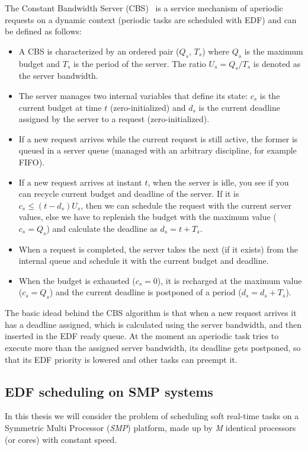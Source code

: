 The Constant Bandwidth Server (CBS)~\cite{abeniButtazzo98,
  abeniButtazzo04} is a service mechanism of aperiodic requests on a
dynamic context (periodic tasks are scheduled with EDF) and can be
defined as follows:
\begin{itemize}
\item A CBS is characterized by an ordered pair ($Q_{s}$, $T_{s}$)
  where $Q_{s}$ is the maximum budget and $T_{s}$ is the period of the
  server. The ratio $U_{s} = Q_{s}/T_{s}$ is denoted as the server
  bandwidth.
\item The server manages two internal variables that define its state:
  $c_{s}$ is the current budget at time $t$ (zero-initialized) and
  $d_{s}$ is the current deadline assigned by the server to a request
  (zero-initialized).
\item If a new request arrives while the current request is still
  active, the former is queued in a server queue (managed with an
  arbitrary discipline, for example FIFO).
\item If a new request arrives at instant $t$, when the server is
  idle, you see if you can recycle current budget and deadline of the
  server. If it is $c_{s} \leq (t - d_{s})U_{s}$, then we can schedule
  the request with the current server values, else we have to
  replenish the budget with the maximum value ($c_{s} = Q_{s}$) and
  calculate the deadline as $d_{s} = t + T_{s}$.
\item When a request is completed, the server takes the next (if it
  exists) from the internal queue and schedule it with the current
  budget and deadline.
\item When the budget is exhausted ($c_{s} = 0$), it is recharged at
  the maximum value ($c_{s} = Q_{s}$) and the current deadline is
  postponed of a period ($d_{s} = d_{s} + T_{s}$).
\end{itemize}
The basic idead behind the CBS algorithm is that when a new request
arrives it has a deadline assigned, which is calculated using the
server bandwidth, and then inserted in the EDF ready queue. At the
moment an aperiodic task tries to execute more than the assigned
server bandwidth, its deadline gets postponed, so that its EDF
priority is lowered and other tasks can preempt it.

\subsection{EDF scheduling on SMP systems\label{EDF_SMP}}
In this thesis we will consider the problem of scheduling soft
real-time tasks on a Symmetric Multi Processor (\emph{SMP}) platform,
made up by \emph{M} identical processors (or cores) with constant
speed.

